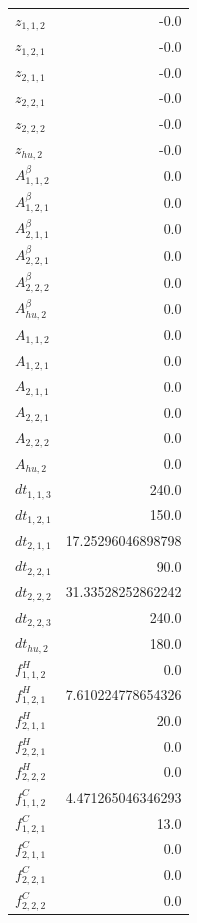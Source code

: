 \documentclass{article}%
\makeatletter
\let\mcnewpage=\newpage%
\newcommand{\TrickSupertabularIntoMulticols}{%
\renewcommand\newpage{%
\if@firstcolumn%
\hrule width\linewidth height0pt%
\columnbreak%
\else%
\mcnewpage%
\fi%
}%
}%
\makeatother
\begin{document}
\begin{multicols*}{3}%
\TrickSupertabularIntoMulticols%
%
\begin{supertabular}{lr}%
	$z_{1,1,2}$ & -0.0 \\%
	$z_{1,2,1}$ & -0.0 \\%
	$z_{2,1,1}$ & -0.0 \\%
	$z_{2,2,1}$ & -0.0 \\%
	$z_{2,2,2}$ & -0.0 \\%
	$z_{hu,2}$ & -0.0 \\%
	$A_{1,1,2}^{\beta}$ & 0.0 \\%
	$A_{1,2,1}^{\beta}$ & 0.0 \\%
	$A_{2,1,1}^{\beta}$ & 0.0 \\%
	$A_{2,2,1}^{\beta}$ & 0.0 \\%
	$A_{2,2,2}^{\beta}$ & 0.0 \\%
	$A_{hu,2}^{\beta}$ & 0.0 \\%
	$A_{1,1,2}$ & 0.0 \\%
	$A_{1,2,1}$ & 0.0 \\%
	$A_{2,1,1}$ & 0.0 \\%
	$A_{2,2,1}$ & 0.0 \\%
	$A_{2,2,2}$ & 0.0 \\%
	$A_{hu,2}$ & 0.0 \\%
	$dt_{1,1,3}$ & 240.0 \\%
	$dt_{1,2,1}$ & 150.0 \\%
	$dt_{2,1,1}$ & 17.25296046898798 \\%
	$dt_{2,2,1}$ & 90.0 \\%
	$dt_{2,2,2}$ & 31.33528252862242 \\%
	$dt_{2,2,3}$ & 240.0 \\%
	$dt_{hu,2}$ & 180.0 \\%
	$f_{1,1,2}^{H}$ & 0.0 \\%
	$f_{1,2,1}^{H}$ & 7.610224778654326 \\%
	$f_{2,1,1}^{H}$ & 20.0 \\%
	$f_{2,2,1}^{H}$ & 0.0 \\%
	$f_{2,2,2}^{H}$ & 0.0 \\%
	$f_{1,1,2}^{C}$ & 4.471265046346293 \\%
	$f_{1,2,1}^{C}$ & 13.0 \\%
	$f_{2,1,1}^{C}$ & 0.0 \\%
	$f_{2,2,1}^{C}$ & 0.0 \\%
	$f_{2,2,2}^{C}$ & 0.0 \\%

\end{supertabular}
\end{multicols*}
\end{document}
